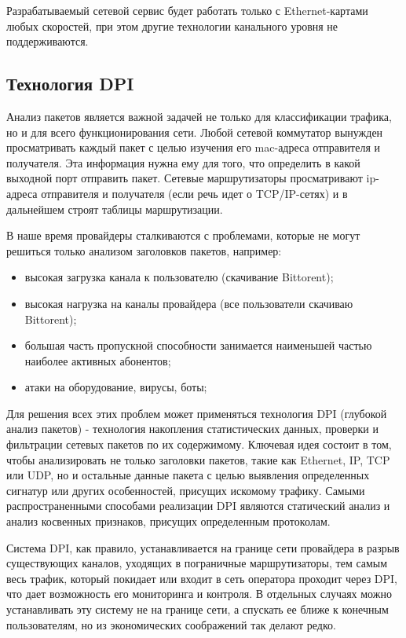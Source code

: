 Разрабатываемый сетевой сервис будет работать только с Ethernet-картами любых скоростей, при этом другие технологии канального уровня не поддерживаются.

\subsection{Технология DPI}
Анализ пакетов является важной задачей не только для классификации трафика, но и для всего функционирования сети. Любой сетевой коммутатор вынужден просматривать каждый пакет с целью изучения его mac-адреса отправителя и получателя. Эта информация нужна ему для того, что определить в какой выходной порт отправить пакет. Сетевые маршрутизаторы просматривают ip-адреса отправителя и получателя (если речь идет о TCP/IP-сетях) и в дальнейшем строят таблицы маршрутизации.

В наше время провайдеры сталкиваются с проблемами, которые не могут решиться только анализом заголовков пакетов, например:
\begin{itemize}
\item высокая загрузка канала к пользователю (скачивание Bittorent);
\item высокая нагрузка на каналы провайдера (все пользователи скачиваю Bittorent);
\item большая часть пропускной способности занимается наименьшей частью наиболее активных абонентов;
\item атаки на оборудование, вирусы, боты;
\end{itemize}

Для решения всех этих проблем может применяться технология DPI (глубокой анализ пакетов) - технология накопления статистических данных, проверки и фильтрации сетевых пакетов по их содержимому. Ключевая идея состоит в том, чтобы анализировать не только заголовки пакетов, такие как Ethernet, IP, TCP или UDP, но и остальные данные пакета с целью выявления определенных сигнатур или других особенностей, присущих искомому трафику. Самыми распространенными способами реализации DPI являются статический анализ и анализ косвенных признаков, присущих определенным протоколам. 

Система DPI, как правило, устанавливается на границе сети провайдера в разрыв существующих каналов, уходящих в пограничные маршрутизаторы, тем самым весь трафик, который покидает или входит в сеть оператора проходит через DPI, что дает возможность его мониторинга и контроля. В отдельных случаях можно устанавливать эту систему не на границе сети, а спускать ее ближе к конечным пользователям, но из экономических соображений так делают редко.

